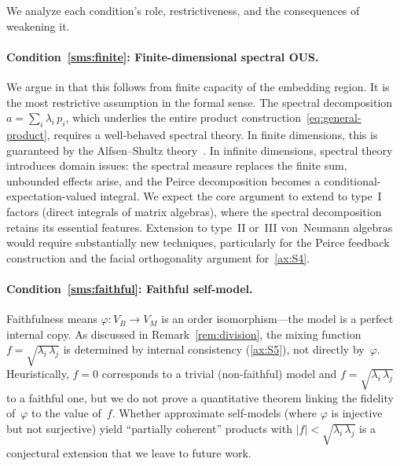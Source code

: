 We analyze each condition's role, restrictiveness, and the
consequences of weakening it.

\paragraph{Condition~\ref{sms:finite}: Finite-dimensional spectral OUS.}
We argue in  that this follows from finite
capacity of the embedding region.  It is the most restrictive
assumption in the formal sense.  The spectral decomposition
$a = \sum_{i} \lambda_{i}\, p_{i}$, which underlies the entire
product construction~\eqref{eq:general-product}, requires a
well-behaved spectral theory.  In finite dimensions, this is
guaranteed by the Alfsen--Shultz theory~\cite{AlfsenShultz2003}.  In
infinite dimensions, spectral theory introduces domain issues: the
spectral measure replaces the finite sum, unbounded effects arise, and
the Peirce decomposition becomes a conditional-expectation-valued
integral.  We expect the core argument to extend to type~I factors
(direct integrals of matrix algebras), where the spectral
decomposition retains its essential features.  Extension to type~II
or~III von~Neumann algebras would require substantially new techniques,
particularly for the Peirce feedback construction and the facial
orthogonality argument for~\ref{ax:S4}.

\paragraph{Condition~\ref{sms:faithful}: Faithful self-model.}
Faithfulness means $\varphi: V_{B} \to V_{M}$ is an order
isomorphism---the model is a perfect internal copy.  As discussed in
Remark~\ref{rem:division}, the mixing function
$f = \sqrt{\lambda_{i}\, \lambda_{j}}$ is determined by
internal consistency (\ref{ax:S5}), not directly by~$\varphi$.
Heuristically, $f = 0$ corresponds to a trivial (non-faithful) model
and $f = \sqrt{\lambda_{i}\, \lambda_{j}}$ to a faithful one, but we
do not prove a quantitative theorem linking the fidelity of~$\varphi$
to the value of~$f$.  Whether approximate self-models (where
$\varphi$ is injective but not surjective) yield ``partially
coherent'' products with $|f| < \sqrt{\lambda_{i}\, \lambda_{j}}$
is a conjectural extension that we leave to future work.

